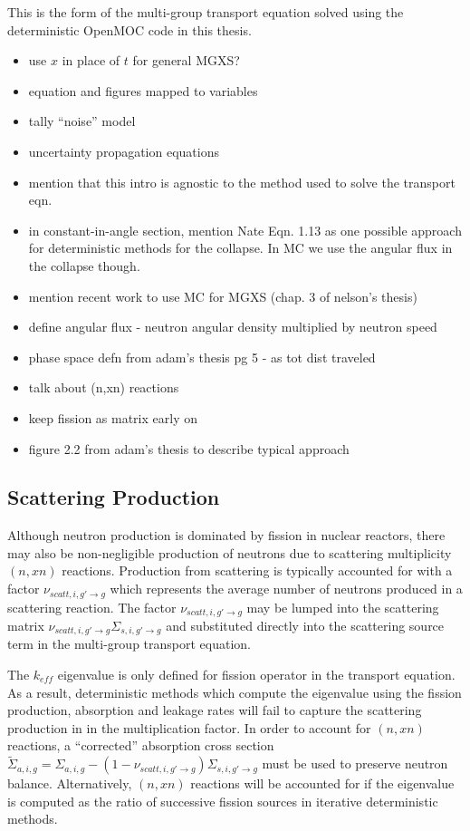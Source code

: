 This is the form of the multi-group transport equation solved using the deterministic OpenMOC code in this thesis. 


\begin{itemize}[noitemsep]
  \item use $x$ in place of $t$ for general \ac{MGXS}?
  \item equation and figures mapped to variables
  \item tally ``noise'' model
  \item uncertainty propagation equations
  \item mention that this intro is agnostic to the method used to solve the transport eqn.
   \item in constant-in-angle section, mention Nate Eqn. 1.13 as one possible approach for deterministic methods for the collapse. In MC we use the angular flux in the collapse though.
   \item mention recent work to use MC for MGXS (chap. 3 of nelson's thesis)
   \item define angular flux - neutron angular density multiplied by neutron speed
   \item phase space defn from adam's thesis pg 5 - as tot dist traveled
   \item talk about (n,xn) reactions
   \item keep fission as matrix early on
   \item figure 2.2 from adam's thesis to describe typical approach
\end{itemize}


\subsection{Scattering Production}
\label{sec:chap2-scatt-prod}

Although neutron production is dominated by fission in nuclear reactors, there may also be non-negligible production of neutrons due to scattering multiplicity $(n,xn)$ reactions. Production from scattering is typically accounted for with a factor $\nu_{scatt,i,g' \rightarrow g}$ which represents the average number of neutrons produced in a scattering reaction. The factor $\nu_{scatt,i,g' \rightarrow g}$ may be lumped into the scattering matrix $\nu_{scatt,i,g' \rightarrow g}\Sigma_{s,i,g' \rightarrow g}$ and substituted directly into the scattering source term in the multi-group transport equation. 

The $k_{eff}$ eigenvalue is only defined for fission operator in the transport equation. As a result, deterministic methods which compute the eigenvalue using the fission production, absorption and leakage rates will fail to capture the scattering production in in the multiplication factor. In order to account for $(n,xn)$ reactions, a ``corrected'' absorption cross section $\tilde{\Sigma}_{a,i,g} = \Sigma_{a,i,g} - (1-\nu_{scatt,i,g' \rightarrow g})\Sigma_{s,i,g' \rightarrow g}$ must be used to preserve neutron balance. Alternatively, $(n,xn)$ reactions will be accounted for if the eigenvalue is computed as the ratio of successive fission sources in iterative deterministic methods.


